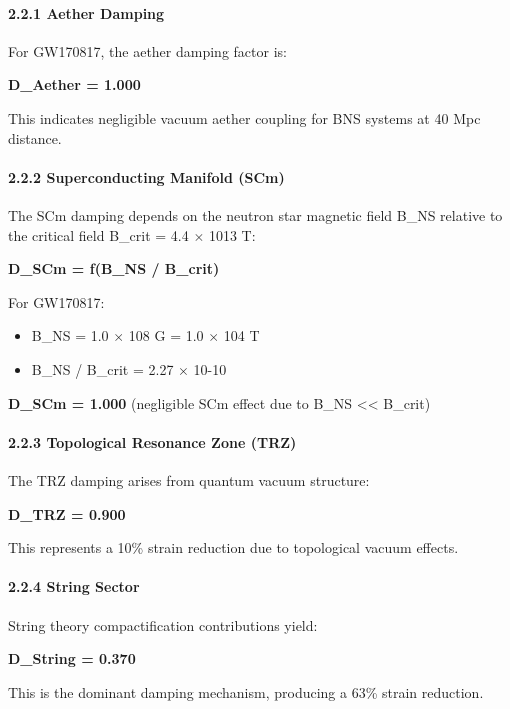 \documentclass[
  11pt,
]{article}
\providecommand{\tightlist}{%
  \setlength{\itemsep}{0pt}\setlength{\parskip}{0pt}}
\begin{document}
\paragraph{2.2.1 Aether Damping}\label{aether-damping}

For GW170817, the aether damping factor is:

\textbf{D\_Aether = 1.000}

This indicates negligible vacuum aether coupling for BNS systems at 40
Mpc distance.

\paragraph{2.2.2 Superconducting Manifold
(SCm)}\label{superconducting-manifold-scm}

The SCm damping depends on the neutron star magnetic field B\_NS
relative to the critical field B\_crit = 4.4 $\times$ 1013 T:

\textbf{D\_SCm = f(B\_NS / B\_crit)}

For GW170817:

\begin{itemize}
\tightlist
\item
  B\_NS = 1.0 $\times$ 108 G = 1.0 $\times$ 104 T
\item
  B\_NS / B\_crit = 2.27 $\times$ 10-10
\end{itemize}

\textbf{D\_SCm = 1.000} (negligible SCm effect due to B\_NS
\textless\textless{} B\_crit)

\paragraph{2.2.3 Topological Resonance Zone
(TRZ)}\label{topological-resonance-zone-trz}

The TRZ damping arises from quantum vacuum structure:

\textbf{D\_TRZ = 0.900}

This represents a 10\% strain reduction due to topological vacuum
effects.

\paragraph{2.2.4 String Sector}\label{string-sector}

String theory compactification contributions yield:

\textbf{D\_String = 0.370}

This is the dominant damping mechanism, producing a 63\% strain
reduction.
\end{document}
